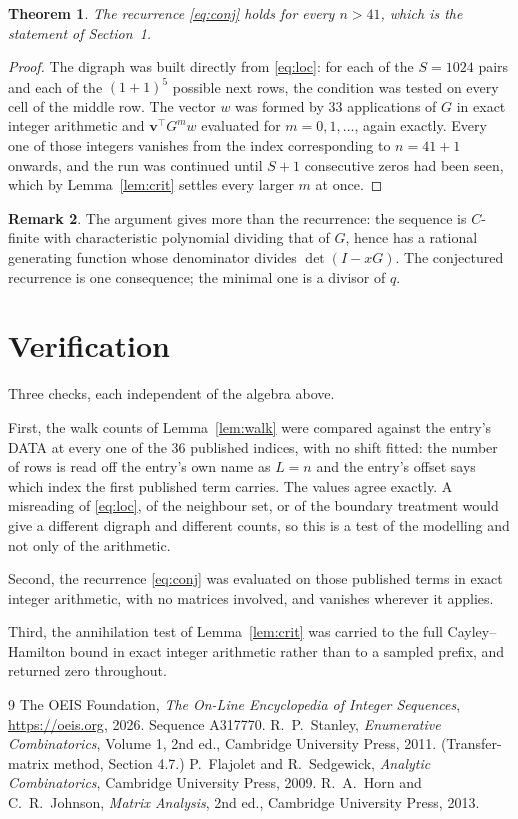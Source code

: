 \documentclass[11pt,a4paper]{article}
\theoremstyle{plain}
\newtheorem{theorem}{Theorem}
\theoremstyle{definition}
\newtheorem{remark}[theorem]{Remark}
\begin{document}
\begin{theorem}
The recurrence \eqref{eq:conj} holds for every $n>41$, which is the statement of
Section~1.
\end{theorem}

\begin{proof}
The digraph was built directly from \eqref{eq:loc}: for each of the $S=1024$ pairs and each
of the $(1+1)^{5}$ possible next rows, the condition was tested on every cell of
the middle row. The vector $w$ was formed by $33$ applications of $G$ in exact integer
arithmetic and $\mathbf{v}^{\!\top}G^{m}w$ evaluated for $m=0,1,\dots$, again exactly.
Every one of those integers vanishes from the index corresponding to $n=41+1$ onwards,
and the run was continued until $S+1$ consecutive zeros had been seen, which by
Lemma~\ref{lem:crit} settles every larger $m$ at once.
\end{proof}

\begin{remark}
The argument gives more than the recurrence: the sequence is $C$-finite with characteristic
polynomial dividing that of $G$, hence has a rational generating function whose denominator
divides $\det(I-xG)$. The conjectured recurrence is one consequence; the minimal one is a
divisor of $q$.
\end{remark}

\section{Verification}

Three checks, each independent of the algebra above.

First, the walk counts of Lemma~\ref{lem:walk} were compared against the entry's DATA at
every one of the $36$ published indices, with no shift fitted: the number of rows is
read off the entry's own name as $L=n$ and the entry's offset says which index the first
published term carries. The values agree exactly. A misreading of \eqref{eq:loc}, of the
neighbour set, or of the boundary treatment would give a different digraph and different
counts, so this is a test of the modelling and not only of the arithmetic.

Second, the recurrence \eqref{eq:conj} was evaluated on those published terms in exact
integer arithmetic, with no matrices involved, and vanishes wherever it applies.

Third, the annihilation test of Lemma~\ref{lem:crit} was carried to the full
Cayley--Hamilton bound in exact integer arithmetic rather than to a sampled prefix, and
returned zero throughout.

\begin{thebibliography}{9}
 The OEIS Foundation, \emph{The On-Line Encyclopedia of Integer
Sequences}, \url{https://oeis.org}, 2026. Sequence A317770.
 R.~P.~Stanley, \emph{Enumerative Combinatorics}, Volume 1, 2nd ed.,
Cambridge University Press, 2011. (Transfer-matrix method, Section 4.7.)
 P.~Flajolet and R.~Sedgewick, \emph{Analytic Combinatorics}, Cambridge
University Press, 2009.
 R.~A.~Horn and C.~R.~Johnson, \emph{Matrix Analysis}, 2nd ed., Cambridge
University Press, 2013.
\end{thebibliography}
\end{document}
